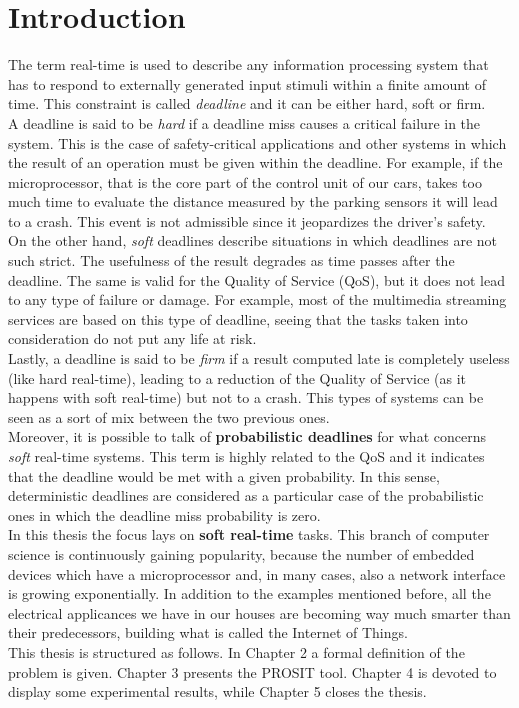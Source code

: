 \chapter{Introduction}\label{chp:introduction}


The term real-time \cite{hardrealtime} is used to describe any information processing system that has to respond to externally generated input stimuli within a finite amount of time. This constraint is called \emph{deadline} and it can be either hard, soft or firm.\\
A deadline is said to be \emph{hard} if a deadline miss causes a critical failure in the system. This is the case of safety-critical applications and other systems in which the result of an operation must be given within the deadline. For example, if the microprocessor, that is the core part of the control unit of our cars, takes too much time to evaluate the distance measured by the parking sensors it will lead to a crash. This event is not admissible since it jeopardizes the driver's safety.\\
On the other hand, \emph{soft} deadlines describe situations in which deadlines are not such strict. The usefulness of the result degrades as time passes after the deadline. The same is valid for the Quality of Service (QoS), but it does not lead to any type of failure or damage. For example, most of the multimedia streaming services are based on this type of deadline, seeing that the tasks taken into consideration do not put any life at risk.\\
Lastly, a deadline is said to be \emph{firm} if a result computed late is completely useless (like hard real-time), leading to a reduction of the Quality of Service (as it happens with soft real-time) but not to a crash. This types of systems can be seen as a sort of mix between the two previous ones.\\
Moreover, it is possible to talk of \textbf{probabilistic deadlines} \cite{abeni} for what concerns \emph{soft} real-time systems. This term is highly related to the QoS and it indicates that the deadline would be met with a given probability. In this sense, deterministic deadlines are considered as a particular case of the probabilistic ones in which the deadline miss probability is zero.\\ 
In this thesis the focus lays on \textbf{soft real-time} tasks. This branch of computer science is continuously gaining popularity, because the number of embedded devices which have a microprocessor and, in many cases, also a network interface is growing exponentially. In addition to the examples mentioned before, all the electrical applicances we have in our houses are becoming way much smarter than their predecessors, building what is called the Internet of Things.\\
This thesis is structured as follows. In Chapter 2 a formal definition of the problem is given. Chapter 3 presents the PROSIT tool. Chapter 4 is devoted to display some experimental results, while Chapter 5 closes the thesis.      